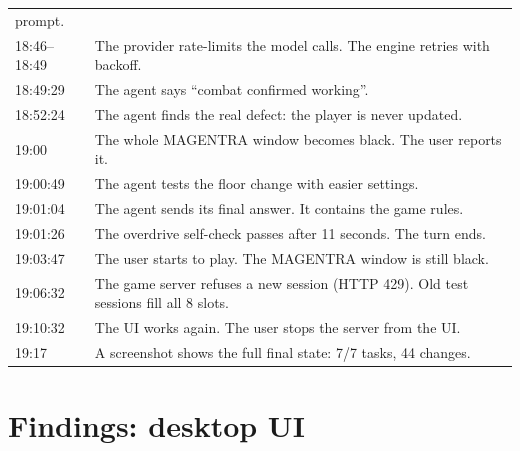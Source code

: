 \documentclass[11pt,a4paper]{article}
\begin{document}
\begin{longtable}{@{}p{2.3cm}p{12.7cm}@{}}
           prompt. \\
18:46--18:49 & The provider rate-limits the model calls. The engine retries with
           backoff. \\
18:49:29 & The agent says ``combat confirmed working''. \\
18:52:24 & The agent finds the real defect: the player is never updated. \\
19:00 & The whole MAGENTRA window becomes black. The user reports it. \\
19:00:49 & The agent tests the floor change with easier settings. \\
19:01:04 & The agent sends its final answer. It contains the game rules. \\
19:01:26 & The overdrive self-check passes after 11 seconds. The turn ends. \\
19:03:47 & The user starts to play. The MAGENTRA window is still black. \\
19:06:32 & The game server refuses a new session (HTTP 429). Old test sessions
           fill all 8 slots. \\
19:10:32 & The UI works again. The user stops the server from the UI. \\
19:17 & A screenshot shows the full final state: 7/7 tasks, 44 changes. \\
\bottomrule
\end{longtable}

\section{Findings: desktop UI}
\end{document}
